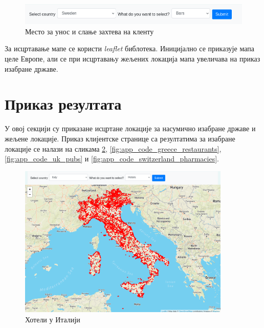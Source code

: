 \documentclass[12pt,oneside]{memoir}
\begin{document}
\begin{figure}[!ht]
  \centering
  \includegraphics[width=1\textwidth]{pictures/frontend_request_bar.png}
  \caption{Место за унос и слање захтева на кленту}
  \label{fig:app_code_request_bar_front}
\end{figure}

За исцртавање мапе се користи \textit{leaflet} библотека. Иницијално се приказује мапа целе Европе, али се при исцртавању жељених локација мапа увеличава на приказ изабране државе.

\section{Приказ резултата}
\label{sec:rezultat}

У овој секцији су приказане исцртане локације за насумично изабране државе и жељене локације. Приказ клијентске странице са резултатима за изабране локације се налази на сликама \ref{fig:app_code_italy_hotel}, \ref{fig:app_code_greece_restaurants}, \ref{fig:app_code_uk_pubs} и \ref{fig:app_code_switzerland_pharmacies}.

\begin{figure}[!ht]
  \centering
  \includegraphics[width=0.9\textwidth]{pictures/italy_hotels.png}
  \caption{Хотели у Италији}
  \label{fig:app_code_italy_hotel}
\end{figure}
\end{document}
